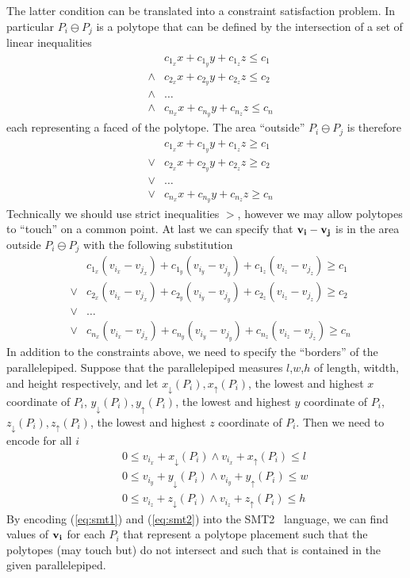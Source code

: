 The latter condition can be translated into a constraint satisfaction
problem. In particular $P_i \ominus P_j$ is a polytope that can be
defined by the intersection of a set of linear inequalities
\begin{eqnarray}
\nonumber
&        & c_{1_x} x + c_{1_y} y + c_{1_z} z \leq c_1 \\
\nonumber
& \wedge & c_{2_x} x + c_{2_y} y + c_{2_z} z \leq c_2 \\
\nonumber
& \wedge & \ldots \\
\nonumber
& \wedge & c_{n_x} x + c_{n_y} y + c_{n_z} z \leq c_n
\end{eqnarray}
each representing a faced of the polytope. The
area ``outside'' $P_i \ominus P_j$ is therefore
\begin{eqnarray}
\nonumber
&      & c_{1_x} x + c_{1_y} y + c_{1_z} z \geq c_1 \\
\nonumber
& \vee & c_{2_x} x + c_{2_y} y + c_{2_z} z \geq c_2 \\
\nonumber
& \vee & \ldots \\
\nonumber
& \vee & c_{n_x} x + c_{n_y} y + c_{n_z} z \geq c_n
\end{eqnarray}
Technically we should use strict inequalities $>$, however
we may allow polytopes to ``touch'' on a common point. At last
we can specify that $\mathbf{v_i} - \mathbf{v_j}$ is in the
area outside $P_i \ominus P_j$ with the following substitution
\begin{eqnarray}
\nonumber
&      & c_{1_x} (v_{i_x} - v_{j_x}) + c_{1_y} (v_{i_y} - v_{j_y}) + c_{1_z} (v_{i_z}-v_{j_z}) \geq c_1 \\
\nonumber
& \vee & c_{2_x} (v_{i_x} - v_{j_x}) + c_{2_y} (v_{i_y} - v_{j_y}) + c_{2_z} (v_{i_z}-v_{j_z}) \geq c_2 \\
\label{eq:smt1}
& \vee &\ldots \\                                                                                    
\nonumber
& \vee & c_{n_x} (v_{i_x} - v_{j_x}) + c_{n_y} (v_{i_y} - v_{j_y}) + c_{n_z} (v_{i_z}-v_{j_z}) \geq c_n
\end{eqnarray}
In addition to the constraints above, we need to specify the ``borders'' of the parallelepiped. Suppose
that the parallelepiped measures $l$,$w$,$h$ of length, witdth, and height respectively, and let
$x_\downarrow(P_i), x_\uparrow(P_i)$, the lowest and highest $x$ coordinate of $P_i$, 
$y_\downarrow(P_i), y_\uparrow(P_i)$, the lowest and highest $y$ coordinate of $P_i$, 
$z_\downarrow(P_i), z_\uparrow(P_i)$, the lowest and highest $z$ coordinate of $P_i$. Then we
need to encode for all $i$
\begin{eqnarray}
\nonumber
&& 0 \leq v_{i_x} + x_\downarrow(P_i) \wedge v_{i_x} + x_\uparrow(P_i) \leq l \\
\label{eq:smt2}
&& 0 \leq v_{i_y} + y_\downarrow(P_i) \wedge v_{i_y} + y_\uparrow(P_i) \leq w \\
\nonumber
&& 0 \leq v_{i_z} + z_\downarrow(P_i) \wedge v_{i_z} + z_\uparrow(P_i) \leq h
\end{eqnarray}
By encoding (\ref{eq:smt1}) and (\ref{eq:smt2}) into the SMT2~\cite{SMTLIB} language, we can find
values of $\mathbf{v_i}$ for each $P_i$ that represent a polytope placement such
that the polytopes (may touch but) do not intersect and such that
is contained in the given parallelepiped.
